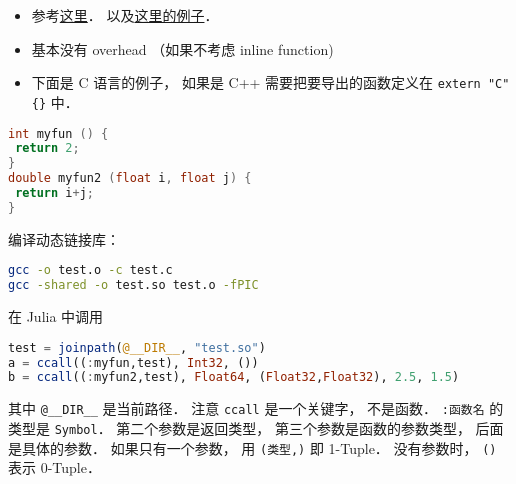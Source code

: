 
\begin{issues}
\issueDraft
\end{issues}

\begin{itemize}
\item 参考\href{https://docs.julialang.org/en/v1/manual/calling-c-and-fortran-code/}{这里}． 以及\href{https://discourse.julialang.org/t/how-to-make-julia-call-c-c-coded-function/54780/5}{这里的例子}．
\item 基本没有 overhead （如果不考虑 inline function)
\item 下面是 C 语言的例子， 如果是 C++ 需要把要导出的函数定义在 \verb|extern "C" {}| 中．
\end{itemize}

\begin{lstlisting}[language=cpp]
int myfun () {
 return 2;
}
double myfun2 (float i, float j) {
 return i+j;
}
\end{lstlisting}

编译动态链接库：
\begin{lstlisting}[language=bash]
gcc -o test.o -c test.c
gcc -shared -o test.so test.o -fPIC
\end{lstlisting}

在 Julia 中调用
\begin{lstlisting}[language=julia]
test = joinpath(@__DIR__, "test.so")
a = ccall((:myfun,test), Int32, ())
b = ccall((:myfun2,test), Float64, (Float32,Float32), 2.5, 1.5)
\end{lstlisting}
其中 \verb|@__DIR__| 是当前路径． 注意 \verb|ccall| 是一个关键字， 不是函数． \verb|:函数名| 的类型是 \verb|Symbol|． 第二个参数是返回类型， 第三个参数是函数的参数类型， 后面是具体的参数． 如果只有一个参数， 用 \verb|(类型,)| 即 1-Tuple． 没有参数时， \verb|()| 表示 0-Tuple．
